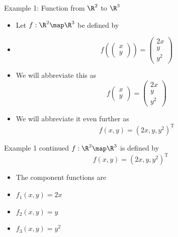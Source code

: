\documentclass{beamer}
\begin{document}

\begin{frame}{Example 1: Function from $\R^2$ to $\R^3$}
\begin{itemize}
\item Let $f:\R^2\map\R^3$ be defined by
\item
$$
f
\left(
\begin{pmatrix}
x \\ y
\end{pmatrix}
\right)
=
\begin{pmatrix}
2x \\ y \\ y^2
\end{pmatrix}
$$
\item We will abbreviate this as
$$
f
\begin{pmatrix}
x \\ y
\end{pmatrix}
=
\begin{pmatrix}
2x \\ y \\ y^2
\end{pmatrix}
$$
\item We will abbreviate it even further as
$$f(x,y) = (2x, y, y^2)^{\text{T}}$$
\end{itemize}
\end{frame}


\begin{frame}{Example 1 continued}
$f:\R^2\map\R^3$ is defined by
$$f(x,y) = (2x, y, y^2)^{\text{T}}$$
\begin{itemize}
\item The component functions are
\item $f_1(x,y) = 2x$
\item $f_2(x,y) = y$
\item $f_3(x,y) = y^2$
\end{itemize}
\end{frame}

\end{document}
